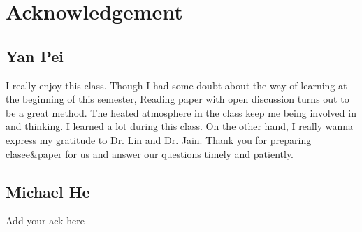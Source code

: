 \section*{Acknowledgement}
\label{sec:acknowledge}

  \subsection*{Yan Pei}
  \label{sec:ypeiack}
  I really enjoy this class. Though I had some doubt about the way of learning at the beginning of this semester, Reading paper with open discussion turns out to be a great method. The heated atmosphere in the class keep me being involved in and thinking. I learned a lot during this class. On the other hand, I really wanna express my gratitude to Dr. Lin and Dr. Jain. Thank you for preparing clasee\&paper for us and answer our questions timely and patiently.

  \subsection*{Michael He}
  \label{sec:jyheack}
  Add your ack here
